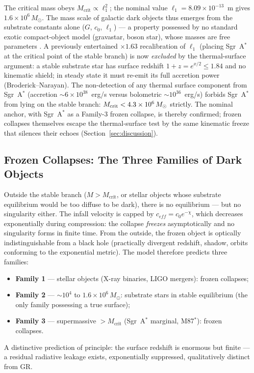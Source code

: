 \documentclass[11pt,a4paper]{article}
\theoremstyle{plain}
\theoremstyle{remark}
\begin{document}
The critical mass obeys $M_{\text{crit}} \propto \ell_1^2$; the nominal value $\ell_1 = 8.09\times10^{-13}$~m gives $1.6\times10^{6}\,M_\odot$. The mass scale of galactic dark objects thus emerges from the substrate constants alone ($G$, $c_0$, $\ell_1$) --- a property possessed by no standard exotic compact-object model (gravastar, boson star), whose masses are free parameters \cite{mazur2001, mazur2023}. A previously entertained $\times1.63$ recalibration of $\ell_1$ (placing Sgr~A$^*$ at the critical point of the stable branch) is now \emph{excluded} by the thermal-surface argument: a stable substrate star has surface redshift $1+z = e^{x/2} \le 1.84$ and no kinematic shield; in steady state it must re-emit its full accretion power (Broderick--Narayan). The non-detection of any thermal surface component from Sgr~A$^*$ (accretion $\sim 6\times10^{38}$~erg/s versus bolometric $\sim 10^{36}$~erg/s) forbids Sgr~A$^*$ from lying on the stable branch: $M_{\rm crit} < 4.3\times10^{6}\,M_\odot$ strictly. The nominal anchor, with Sgr~A$^*$ as a Family-3 frozen collapse, is thereby confirmed; frozen collapses themselves escape the thermal-surface test by the same kinematic freeze that silences their echoes (Section~\ref{sec:discussion}).

\subsection{Frozen Collapses: The Three Families of Dark Objects}
Outside the stable branch ($M > M_{\text{crit}}$, or stellar objects whose substrate equilibrium would be too diffuse to be dark), there is no equilibrium --- but no singularity either. The infall velocity is capped by $c_{eff} = c_0 e^{-\chi}$, which decreases exponentially during compression: the collapse \emph{freezes} asymptotically and no singularity forms in finite time. From the outside, the frozen object is optically indistinguishable from a black hole (practically divergent redshift, shadow, orbits conforming to the exponential metric). The model therefore predicts three families:
\begin{itemize}
    \item \textbf{Family 1} --- stellar objects (X-ray binaries, LIGO mergers): frozen collapses;
    \item \textbf{Family 2} --- $\sim10^{4}$ to $1.6\times10^{6}\,M_\odot$: substrate stars in stable equilibrium (the only family possessing a true surface);
    \item \textbf{Family 3} --- supermassive $> M_{\text{crit}}$ (Sgr~A$^*$ marginal, M87$^*$): frozen collapses.
\end{itemize}
A distinctive prediction of principle: the surface redshift is enormous but finite --- a residual radiative leakage exists, exponentially suppressed, qualitatively distinct from GR.
\end{document}

